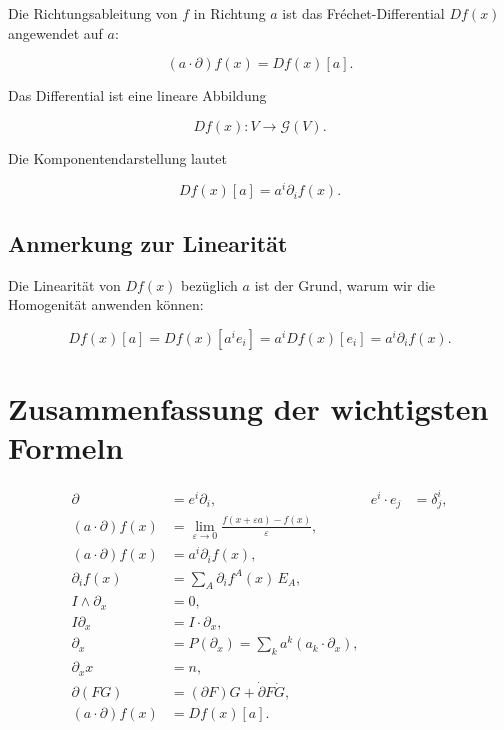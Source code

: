 \documentclass[11pt]{article}
\begin{document}
Die Richtungsableitung von \(f\) in Richtung \(a\) ist das Fréchet-Differential \(Df(x)\) angewendet auf \(a\):

\[
\boxed{
(a \cdot \partial) f(x)
=
Df(x)[a]
}.
\]

Das Differential ist eine lineare Abbildung

\[
Df(x): V \longrightarrow \mathcal G(V).
\]

Die Komponentendarstellung lautet

\[
Df(x)[a] = a^i \partial_i f(x).
\]

\subsection{Anmerkung zur Linearität}

Die Linearität von \(Df(x)\) bezüglich \(a\) ist der Grund, warum wir die Homogenität anwenden können:

\[
Df(x)[a]
=
Df(x)[a^i e_i]
=
a^i Df(x)[e_i]
=
a^i \partial_i f(x).
\]

\begin{center}
\end{center}

\section{Zusammenfassung der wichtigsten Formeln}

\begin{align}
\partial &= e^i \partial_i, & e^i \cdot e_j &= \delta^i_j, \\
(a \cdot \partial) f(x) &= \lim_{\varepsilon \to 0} \frac{f(x + \varepsilon a) - f(x)}{\varepsilon}, \\
(a \cdot \partial) f(x) &= a^i \partial_i f(x), \\
\partial_i f(x) &= \sum_A \partial_i f^A(x) \, E_A, \\
I \wedge \partial_x &= 0, \\
I \partial_x &= I \cdot \partial_x, \\
\partial_x &= P(\partial_x) = \sum_k a^k (a_k \cdot \partial_x), \\
\partial_x x &= n, \\
\partial (FG) &= (\partial F)G + \dot{\partial} F \dot{G}, \\
(a \cdot \partial) f(x) &= Df(x)[a].
\end{align}
\end{document}
